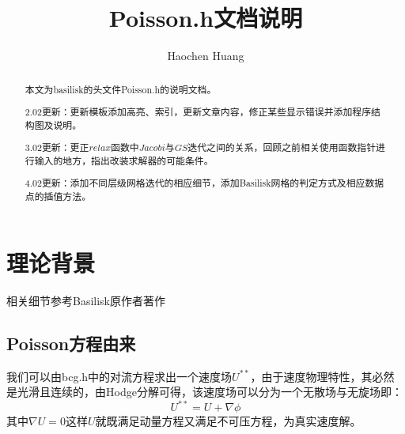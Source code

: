 \documentclass[lang=cn,11pt,a4paper]{elegantpaper}
\title{Poisson.h文档说明}
\author{Haochen Huang}
\date{\zhtoday}
\begin{document}
\maketitle
\tableofcontents

\begin{abstract}
本文为basilisk的头文件Poisson.h的说明文档。\par
2.02更新：更新模板添加高亮、索引，更新文章内容，修正某些显示错误并添加程序结构图及说明。\par
3.02更新：更正$relax$函数中$Jacobi$与$GS$迭代之间的关系，回顾之前相关使用函数指针进行输入的地方，指出改装求解器的可能条件。\par
4.02更新：添加不同层级网格迭代的相应细节，添加Basilisk网格的判定方式及相应数据点的插值方法。
\end{abstract}

\section{理论背景}
相关细节参考Basilisk原作者著作\cite{popinet2003gerris}\cite{popinet2015quadtree}
\subsection{Poisson方程由来}
我们可以由bcg.h中的对流方程求出一个速度场$U^{**}$，由于速度物理特性，其必然是光滑且连续的，由Hodge分解可得，该速度场可以分为一个无散场与无旋场即：
\begin{equation}
    U^{**} = U + \nabla \phi
\end{equation}
其中$\nabla U = 0$这样$U$就既满足动量方程又满足不可压方程，为真实速度解。
\end{document}
